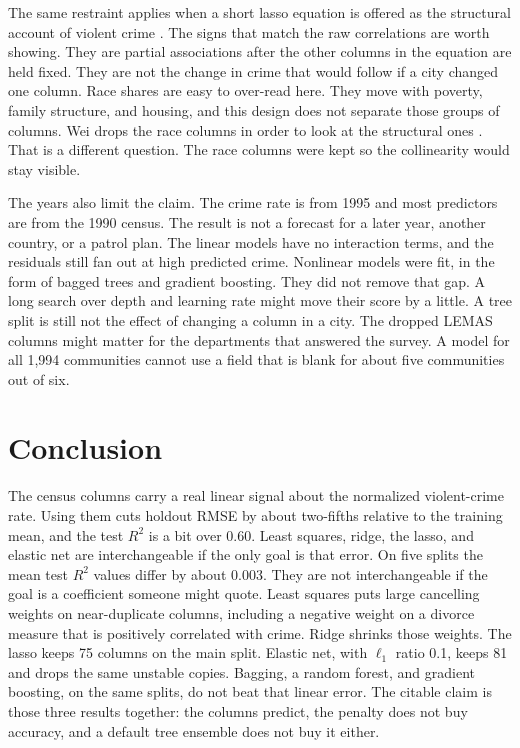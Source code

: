 \documentclass[conference]{IEEEtran}
\begin{document}
The same restraint applies when a short lasso equation is offered as the structural account of violent crime \cite{dai2024,wei2025}.
The signs that match the raw correlations are worth showing.
They are partial associations after the other columns in the equation are held fixed.
They are not the change in crime that would follow if a city changed one column.
Race shares are easy to over-read here.
They move with poverty, family structure, and housing, and this design does not separate those groups of columns.
Wei drops the race columns in order to look at the structural ones \cite{wei2025}.
That is a different question.
The race columns were kept so the collinearity would stay visible.

The years also limit the claim.
The crime rate is from 1995 and most predictors are from the 1990 census.
The result is not a forecast for a later year, another country, or a patrol plan.
The linear models have no interaction terms, and the residuals still fan out at high predicted crime.
Nonlinear models were fit, in the form of bagged trees and gradient boosting.
They did not remove that gap.
A long search over depth and learning rate might move their score by a little.
A tree split is still not the effect of changing a column in a city.
The dropped LEMAS columns might matter for the departments that answered the survey.
A model for all 1{,}994 communities cannot use a field that is blank for about five communities out of six.

\section{Conclusion}
The census columns carry a real linear signal about the normalized violent-crime rate.
Using them cuts holdout RMSE by about two-fifths relative to the training mean, and the test $R^{2}$ is a bit over 0.60.
Least squares, ridge, the lasso, and elastic net are interchangeable if the only goal is that error.
On five splits the mean test $R^{2}$ values differ by about 0.003.
They are not interchangeable if the goal is a coefficient someone might quote.
Least squares puts large cancelling weights on near-duplicate columns, including a negative weight on a divorce measure that is positively correlated with crime.
Ridge shrinks those weights.
The lasso keeps 75 columns on the main split.
Elastic net, with $\ell_1$ ratio 0.1, keeps 81 and drops the same unstable copies.
Bagging, a random forest, and gradient boosting, on the same splits, do not beat that linear error.
The citable claim is those three results together: the columns predict, the penalty does not buy accuracy, and a default tree ensemble does not buy it either.
\end{document}
